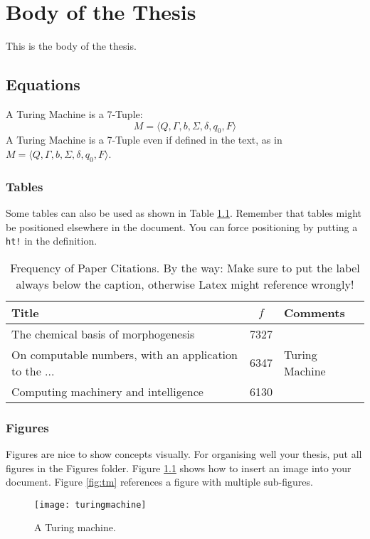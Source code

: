 \chapter{Body of the Thesis}

This is the body of the thesis.

\section{Equations}
A Turing Machine is a 7-Tuple:
\begin{equation}
    M = \langle Q, \Gamma, b, \Sigma, \delta, q_0, F \rangle
\end{equation}
A Turing Machine is a 7-Tuple even if defined in the text, as in $M = \langle Q, \Gamma, b, \Sigma, \delta, q_0, F \rangle$.

\subsection{Tables}
Some tables can also be used as shown in Table \ref{tab:table}. Remember that tables might be positioned elsewhere in the document. You can force positioning by putting a \texttt{ht!} in the definition.

\begin{table}[ht!]
\centering
\begin{tabular}{|l|c|l|} \hline
Title&$f$&Comments\\ \hline
The chemical basis of morphogenesis & 7327 & \\ \hline
On computable numbers, with an application to the ... & 6347 & Turing Machine\\ \hline
Computing machinery and intelligence & 6130 & \\ \hline
\end{tabular}
\caption{Frequency of Paper Citations. By the way: Make sure to put the label always below the caption, otherwise Latex might reference wrongly!}
\label{tab:table}
\end{table}


\subsection{Figures}
Figures are nice to show concepts visually. For organising well your thesis, put all figures in the Figures folder. Figure \ref{fig:machine} shows how to insert an image into your document. Figure \ref{fig:tm} references a figure with multiple sub-figures.

\begin{figure}
\centering
\texttt{[image: turingmachine]}
\caption{A Turing machine.}
\label{fig:machine}
\end{figure}


